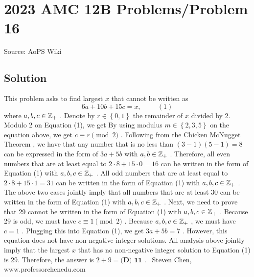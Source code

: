 \documentclass[12pt]{article}
\begin{document}
\section*{{2023 AMC 12B Problems/Problem 16}}
Source: AoPS Wiki

\subsection*{Solution}
This problem asks to find largest $x$ that cannot be written as \[6 a + 10 b + 15 c = x, \hspace{1cm} (1)\] where $a, b, c \in \Bbb Z_+$ . Denote by $r \in \left\{ 0, 1 \right\}$ the remainder of $x$ divided by 2.
Modulo 2 on Equation (1), we get
By using modulus $m \in \left\{ 2, 3, 5 \right\}$ on the equation above, we get $c \equiv r \pmod{2}$ . Following from the Chicken McNugget Theorem , we have that any number that is no less than $(3-1)(5-1) = 8$ can be expressed in the form of $3a + 5b$ with $a, b \in \Bbb Z_+$ . Therefore, all even numbers that are at least equal to $2 \cdot 8 + 15 \cdot 0 = 16$ can be written in the form of Equation (1) with $a, b, c \in \Bbb Z_+$ .
All odd numbers that are at least equal to $2 \cdot 8 + 15 \cdot 1 = 31$ can be written in the form of Equation (1) with $a, b, c \in \Bbb Z_+$ . The above two cases jointly imply that all numbers that are at least 30 can be written in the form of Equation (1) with $a, b, c \in \Bbb Z_+$ . Next, we need to prove that 29 cannot be written in the form of Equation (1) with $a, b, c \in \Bbb Z_+$ . Because 29 is odd, we must have $c \equiv 1 \pmod{2}$ .
Because $a, b, c \in \Bbb Z_+$ , we must have $c = 1$ .
Plugging this into Equation (1), we get $3 a + 5 b = 7$ .
However, this equation does not have non-negative integer solutions. All analysis above jointly imply that the largest $x$ that has no non-negative integer solution to Equation (1) is 29.
Therefore, the answer is $2 + 9 = \boxed{\textbf{(D) 11}}$ . ~Steven Chen, www.professorchenedu.com
\end{document}
